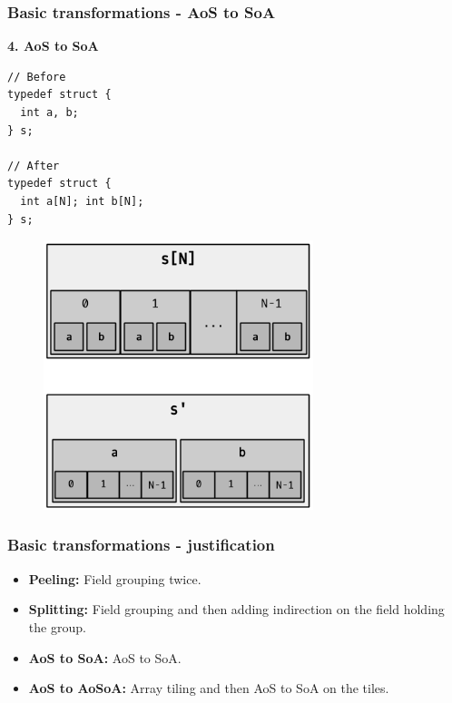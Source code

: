 \begin{frame}[fragile]
\frametitle{Basic transformations - AoS to SoA}

\begin{center}
\begin{minipage}{0.3\linewidth}
\textbf{\small 4. AoS to SoA}
\begin{lstlisting}[style=Cstyle, basicstyle=\scriptsize]
// Before
typedef struct {
  int a, b;
} s;

// After
typedef struct {
  int a[N]; int b[N];
} s;
\end{lstlisting}
\end{minipage}%
\begin{minipage}{0.5\linewidth}
\begin{figure}
	\centering
	\includegraphics[width=0.7\textwidth]{images/soa}
\end{figure}
\end{minipage}
\end{center}

\end{frame}


\begin{frame}[fragile]
\frametitle{Basic transformations - justification}

\begin{itemize}
	\setlength\itemsep{1.5em}
	\item \textbf{Peeling:} Field grouping twice. \pause
	\item \textbf{Splitting:} Field grouping and then adding indirection on the field holding the group. \pause
	\item \textbf{AoS to SoA:} AoS to SoA. \pause
	\item \textbf{AoS to AoSoA:} Array tiling and then AoS to SoA on the tiles.
\end{itemize}

\end{frame}


